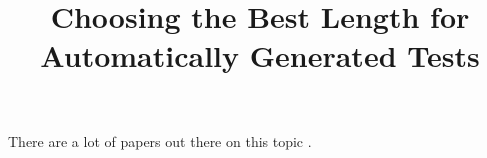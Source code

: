 \documentclass{IEEEtran}
\title{Choosing the Best Length for Automatically Generated Tests}
\author{}
\begin{document}
\maketitle



There are a lot of papers out there on this topic \cite{ASE08}.



\end{document}
